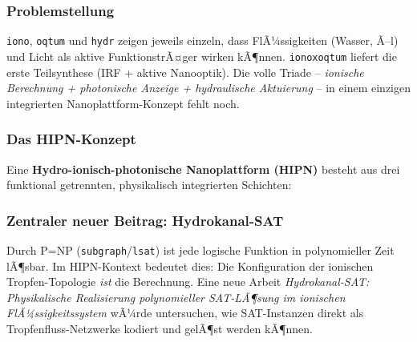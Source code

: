 ﻿\documentclass[a4paper,12pt]{scrreprt}
\theoremstyle{definition}
\begin{document}
\subsubsection{Problemstellung}

\texttt{iono}, \texttt{oqtum} und \texttt{hydr} zeigen jeweils einzeln,
dass FlÃ¼ssigkeiten (Wasser, Ã–l) und Licht als aktive FunktionstrÃ¤ger
wirken kÃ¶nnen. \texttt{ionoxoqtum} liefert die erste Teilsynthese
(IRF + aktive Nanooptik). Die volle Triade -- \emph{ionische Berechnung +
photonische Anzeige + hydraulische Aktuierung} -- in einem einzigen
integrierten Nanoplattform-Konzept fehlt noch.

\subsubsection{Das HIPN-Konzept}

Eine \textbf{Hydro-ionisch-photonische Nanoplattform (HIPN)} besteht aus
drei funktional getrennten, physikalisch integrierten Schichten:

\begin{center}
\end{center}

\subsubsection{Zentraler neuer Beitrag: Hydrokanal-SAT}

Durch P=NP (\texttt{subgraph}/\texttt{lsat}) ist jede logische Funktion
in polynomieller Zeit lÃ¶sbar. Im HIPN-Kontext bedeutet dies: Die Konfiguration
der ionischen Tropfen-Topologie \emph{ist} die Berechnung. Eine neue Arbeit
\emph{Hydrokanal-SAT: Physikalische Realisierung polynomieller SAT-LÃ¶sung
im ionischen FlÃ¼ssigkeitssystem} wÃ¼rde untersuchen, wie SAT-Instanzen
direkt als Tropfenfluss-Netzwerke kodiert und gelÃ¶st werden kÃ¶nnen.
\end{document}
